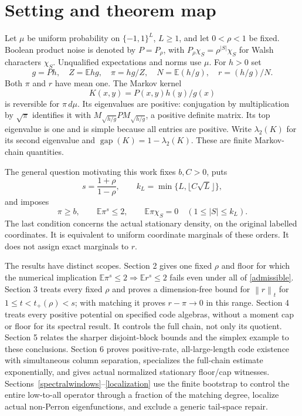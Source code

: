 \documentclass[11pt]{article}
\newcommand{\E}{\mathbb E}
\newcommand{\norm}[1]{\left\|#1\right\|}
\begin{document}
\section{Setting and theorem map}
Let $\mu$ be uniform probability on $\{-1,1\}^L$, $L\geq1$, and let $0<\rho<1$ be fixed. Boolean product noise is denoted by $P=P_\rho$, with $P_\rho\chi_S=\rho^{|S|}\chi_S$ for Walsh characters $\chi_S$. Unqualified expectations and norms use $\mu$. For $h>0$ set
\[
 g=Ph,\quad Z=\E hg,\quad \pi=hg/Z,\quad
 N=\E(h/g),\quad r=(h/g)/N.
\]
Both $\pi$ and $r$ have mean one. The Markov kernel
\[
 K(x,y)=P(x,y)h(y)/g(x)
\]
is reversible for $\pi\,d\mu$. Its eigenvalues are positive: conjugation by multiplication by $\sqrt\pi$ identifies it with
$M_{\sqrt{h/g}}P M_{\sqrt{h/g}}$, a positive definite matrix. Its top eigenvalue is one and is simple because all entries are positive. Write $\lambda_2(K)$ for its second eigenvalue and $\operatorname{gap}(K)=1-\lambda_2(K)$. These are finite Markov-chain quantities.

The general question motivating this work fixes $b,C>0$, puts
\[
 s=\frac{1+\rho}{1-\rho},\qquad k_L=\min\{L,\lfloor C\sqrt L\rfloor\},
\]
and imposes
\begin{equation}\label{admissible}
 \pi\geq b,\qquad \E\pi^s\leq2,\qquad
 \E\pi\chi_S=0\quad(1\leq |S|\leq k_L).
\end{equation}
The last condition concerns the actual stationary density, on the original labelled coordinates. It is equivalent to uniform coordinate marginals of these orders. It does not assign exact marginals to $r$.

The results have distinct scopes. Section 2 gives one fixed $\rho$ and floor for which the numerical implication $\E\pi^s\leq2\Rightarrow\E r^s\leq2$ fails even under all of \eqref{admissible}. Section 3 treats every fixed $\rho$ and proves a dimension-free bound for $\norm r_t$ for $1\leq t<t_+(\rho)<s$; with matching it proves $r-\pi\to0$ in this range. Section 4 treats every positive potential on specified code algebras, without a moment cap or floor for its spectral result. It controls the full chain, not only its quotient. Section 5 relates the sharper disjoint-block bounds and the simplex example to these conclusions. Section 6 proves positive-rate, all-large-length code existence with simultaneous column separation, specializes the full-chain estimate exponentially, and gives actual normalized stationary floor/cap witnesses. Sections~\ref{spectralwindows}--\ref{localization} use the finite bootstrap to control the entire low-to-all operator through a fraction of the matching degree, localize actual non-Perron eigenfunctions, and exclude a generic tail-space repair.
\end{document}
